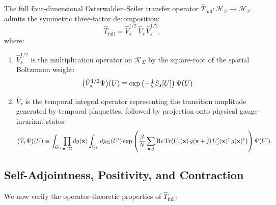 \begin{definition}
\label{def:transfer_factorization}
The full four-dimensional Osterwalder--Seiler transfer operator $\hat{T}_{\mathrm{full}} : \mathcal{H}_\Sigma \to \mathcal{H}_\Sigma$ admits the symmetric three-factor decomposition:
\begin{equation}
\label{eq:transfer_symmetric_factorization}
\hat{T}_{\mathrm{full}} = \hat{V}_s^{1/2} \, \hat{V}_\tau \, \hat{V}_s^{1/2},
\end{equation}
where:
\begin{enumerate}
    \item $\hat{V}_s^{1/2}$ is the multiplication operator on $\mathcal{K}_\Sigma$ by the square-root of the spatial Boltzmann weight:
    \begin{equation}
    \label{eq:v_s_half_def}
    \bigl( \hat{V}_s^{1/2} \Psi \bigr)(U) \equiv \exp\left( -\tfrac{1}{2} S_s[U] \right) \Psi(U).
    \end{equation}
    \item $\hat{V}_\tau$ is the temporal integral operator representing the transition amplitude generated by temporal plaquettes, followed by projection onto physical gauge-invariant states:
    \begin{equation}
    \label{eq:v_tau_integral_kernel}
    \bigl( \hat{V}_\tau \Psi \bigr)(U) \equiv \int_{\mathcal{G}_\Sigma} \prod_{\mathbf{x} \in \Sigma} dg(\mathbf{x}) \int_{\Omega_\Sigma} d\mu_\Sigma(U') \exp\left( \frac{\beta}{N} \sum_{\mathbf{x}, j} \mathrm{Re} \, \mathrm{Tr} \bigl( U_j(\mathbf{x}) \, g(\mathbf{x}+\hat{j}) \, U_j'(\mathbf{x})^\dagger \, g(\mathbf{x})^\dagger \bigr) \right) \Psi(U').
    \end{equation}
\end{enumerate}
\end{definition}

\subsection{Self-Adjointness, Positivity, and Contraction}
\label{subsec:t_full_properties}

We now verify the operator-theoretic properties of $\hat{T}_{\mathrm{full}}$:

